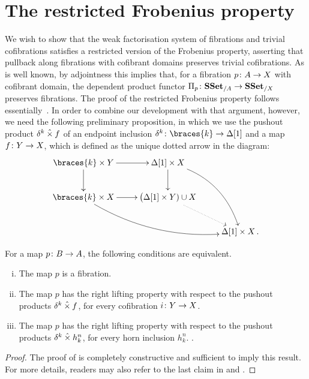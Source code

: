 \documentclass[reqno,10pt,a4paper,oneside,draft]{amsart}
\begin{document}
\section{The restricted Frobenius property}
\label{sec:Pi-types}



We wish to show that the weak factorisation system of fibrations and trivial cofibrations satisfies
a restricted version of the Frobenius property, asserting that pullback along fibrations with cofibrant
domains preserves trivial cofibrations. 
As is well known, by adjointness this implies that, for a fibration $p \colon A \rightarrow X$ with cofibrant
domain, the dependent product functor $\Pi_p \colon \mathbf{SSet}_{/A} \to \mathbf{SSet}_{/X}$ preserves fibrations. The proof of the restricted Frobenius property follows essentially~\cite{gambino2017frobenius}. In order to combine our development with that argument, however, we need the following preliminary proposition, in which we use the pushout product $\delta^k \mathbin{\hat{\times}} f$ of an endpoint inclusion $\kcyl \co \braces{ k } \to \Delta[1]$ and a map~$f \colon Y \to X$, which is defined as the unique dotted arrow  in the diagram:
\[
\xymatrix{
\braces{ k } \times Y \ar[r] \ar[d] &  \Delta[1]  \times X  \ar[d] \ar@/^1.5pc/[ddr] \\
\braces{ k} \times X \ar[r]  \ar@/_1.5pc/[drr] & \big( \Delta[1] \times Y ) \cup X \ar@{.>}[dr]  \\
 & &\Delta[1] \times  X \, .}
 \]



\begin{proposition} For a map $p \colon B \to A$, the following conditions are equivalent.
\begin{enumerate}[(i)] 
\item The map $p$ is a fibration.
\item The map $p$ has the right lifting property with respect to the pushout products $ \delta^k  \mathbin{\hat{\times}} f$, for every cofibration $i \colon Y \to X$.
\item The map $p$ has the right lifting property with respect to the pushout products $ \delta^k  \mathbin{\hat{\times}} h^n_k$, for every  
horn inclusion $h^n_k$. .
\end{enumerate}
\end{proposition} 

\begin{proof}The proof of \cite[Theorem~3.2.3]{joyal-tierney:simplicial-homotopy-theory} is completely constructive and sufficient to imply this result.
For more details, readers may also refer to the last claim in \cite[Corollary~5.3.2]{henry2018wms}
and \cite[Proposition~5.2.6]{henry2018wms}.
\end{proof}
\end{document}
